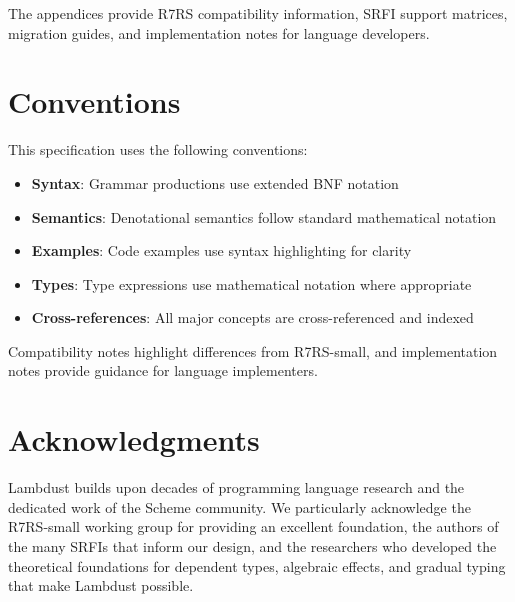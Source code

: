 The appendices provide R7RS compatibility information, SRFI support matrices, migration guides, and implementation notes for language developers.

\section{Conventions}
\label{subsec:conventions}

This specification uses the following conventions:

\begin{itemize}
\item \textbf{Syntax}: Grammar productions use extended BNF notation
\item \textbf{Semantics}: Denotational semantics follow standard mathematical notation
\item \textbf{Examples}: Code examples use syntax highlighting for clarity
\item \textbf{Types}: Type expressions use mathematical notation where appropriate
\item \textbf{Cross-references}: All major concepts are cross-referenced and indexed
\end{itemize}

Compatibility notes highlight differences from R7RS-small, and implementation notes provide guidance for language implementers.

\section{Acknowledgments}
\label{subsec:acknowledgments}

Lambdust builds upon decades of programming language research and the dedicated work of the Scheme community. We particularly acknowledge the R7RS-small working group for providing an excellent foundation, the authors of the many SRFIs that inform our design, and the researchers who developed the theoretical foundations for dependent types, algebraic effects, and gradual typing that make Lambdust possible.